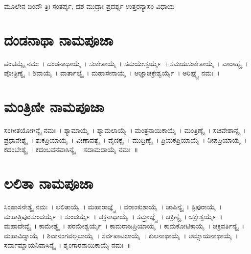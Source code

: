 ಮೂಲೇನ ಬಿಂದೌ ತ್ರಿಃ ಸಂತರ್ಪ್ಯ, ದಶ ಮುದ್ರಾಃ ಪ್ರದರ್ಶ್ಯ ಉತ್ತರನ್ಯಾಸಂ ವಿಧಾಯ
\section{ದಂಡನಾಥಾ ನಾಮಪೂಜಾ}
ಪಂಚಮ್ಯೈ ನಮಃ~।  ದಂಡನಾಥಾಯೈ~।  ಸಂಕೇತಾಯೈ~।  ಸಮಯೇಶ್ವರ್ಯೈ~।  ಸಮಯಸಂಕೇತಾಯೈ~।  ವಾರಾಹ್ಯೈ~।  ಪೋತ್ರಿಣ್ಯೈ~।  ಶಿವಾಯೈ~।  ವಾರ್ತಾಲ್ಯೈ~।  ಮಹಾಸೇನಾಯೈ~।  ಆಜ್ಞಾಚಕ್ರೇಶ್ವರ್ಯೈ~।  ಅರಿಘ್ನ್ಯೈ ನಮಃ ॥
\section{ಮಂತ್ರಿಣೀ ನಾಮಪೂಜಾ}
ಸಂಗೀತಯೋಗಿನ್ಯೈ ನಮಃ~।  ಶ್ಯಾಮಾಯೈ~।  ಶ್ಯಾಮಲಾಯೈ~।  ಮಂತ್ರನಾಯಿಕಾಯೈ~।  ಮಂತ್ರಿಣ್ಯೈ~।  ಸಚಿವೇಶಾನ್ಯೈ~।  ಪ್ರಧಾನೇಶ್ಯೈ~।  ಶುಕಪ್ರಿಯಾಯೈ~।  ವೀಣಾವತ್ಯೈ~।  ವೈಣಿಕ್ಯೈ~।  ಮುದ್ರಿಣ್ಯೈ~।  ಪ್ರಿಯಕಪ್ರಿಯಾಯೈ~।  ನೀಪಪ್ರಿಯಾಯೈ~।  ಕದಂಬೇಶ್ಯೈ~।  ಕದಂಬವನವಾಸಿನ್ಯೈ~।  ಸದಾಮದಾಯೈ ನಮಃ~॥
\section{ಲಲಿತಾ ನಾಮಪೂಜಾ}
ಸಿಂಹಾಸನೇಶ್ಯೈ ನಮಃ~।  ಲಲಿತಾಯೈ~।  ಮಹಾರಾಜ್ಞ್ಯೈ~।  ವರಾಂಕುಶಾಯೈ~।  ಚಾಪಿನ್ಯೈ~।  ತ್ರಿಪುರಾಯೈ~।  ಮಹಾತ್ರಿಪುರಸುಂದರ್ಯೈ~।  ಸುಂದರ್ಯೈ~।  ಚಕ್ರನಾಥಾಯೈ~।  ಸಮ್ರಾಜ್ಞ್ಯೈ~।  ಚಕ್ರಿಣ್ಯೈ~।  ಚಕ್ರೇಶ್ವರ್ಯೈ~।  ಮಹಾದೇವ್ಯೈ~।  ಕಾಮೇಶ್ಯೈ~।  ಪರಮೇಶ್ವರ್ಯೈ~।  ಕಾಮರಾಜಪ್ರಿಯಾಯೈ~।  ಕಾಮಕೋಟಿಕಾಯೈ~।  ಚಕ್ರವರ್ತಿನ್ಯೈ~।  ಮಹಾವಿದ್ಯಾಯೈ~।  ಶಿವಾನಂಗವಲ್ಲಭಾಯೈ~।  ಸರ್ವಪಾಟಲಾಯೈ~।  ಕುಲನಾಥಾಯೈ~।  ಆಮ್ನಾಯನಾಥಾಯೈ~।  ಸರ್ವಾಮ್ನಾಯನಿವಾಸಿನ್ಯೈ~।  ಶೃಂಗಾರನಾಯಿಕಾಯೈ ನಮಃ~॥
